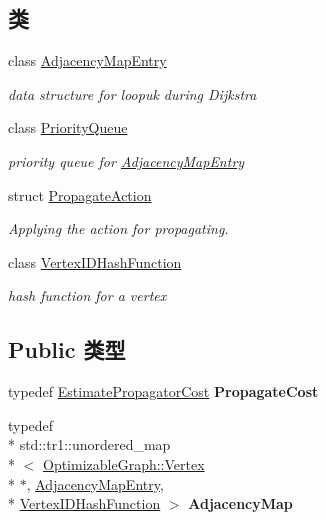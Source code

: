 \subsection*{类}
\begin{DoxyCompactItemize}
\item 
class \hyperlink{classg2o_1_1EstimatePropagator_1_1AdjacencyMapEntry}{Adjacency\-Map\-Entry}
\begin{DoxyCompactList}\small\item\em data structure for loopuk during Dijkstra \end{DoxyCompactList}\item 
class \hyperlink{classg2o_1_1EstimatePropagator_1_1PriorityQueue}{Priority\-Queue}
\begin{DoxyCompactList}\small\item\em priority queue for \hyperlink{classg2o_1_1EstimatePropagator_1_1AdjacencyMapEntry}{Adjacency\-Map\-Entry} \end{DoxyCompactList}\item 
struct \hyperlink{structg2o_1_1EstimatePropagator_1_1PropagateAction}{Propagate\-Action}
\begin{DoxyCompactList}\small\item\em Applying the action for propagating. \end{DoxyCompactList}\item 
class \hyperlink{classg2o_1_1EstimatePropagator_1_1VertexIDHashFunction}{Vertex\-I\-D\-Hash\-Function}
\begin{DoxyCompactList}\small\item\em hash function for a vertex \end{DoxyCompactList}\end{DoxyCompactItemize}
\subsection*{Public 类型}
\begin{DoxyCompactItemize}
\item 
\hypertarget{classg2o_1_1EstimatePropagator_a67a42f9c6d5f92562ac4ea12f81c8d9c}{typedef \hyperlink{classg2o_1_1EstimatePropagatorCost}{Estimate\-Propagator\-Cost} {\bfseries Propagate\-Cost}}\label{classg2o_1_1EstimatePropagator_a67a42f9c6d5f92562ac4ea12f81c8d9c}

\item 
\hypertarget{classg2o_1_1EstimatePropagator_aa450038ec206c089ecf023cb88cb2847}{typedef \\*
std\-::tr1\-::unordered\-\_\-map\\*
$<$ \hyperlink{classg2o_1_1OptimizableGraph_1_1Vertex}{Optimizable\-Graph\-::\-Vertex} \\*
$\ast$, \hyperlink{classg2o_1_1EstimatePropagator_1_1AdjacencyMapEntry}{Adjacency\-Map\-Entry}, \\*
\hyperlink{classg2o_1_1EstimatePropagator_1_1VertexIDHashFunction}{Vertex\-I\-D\-Hash\-Function} $>$ {\bfseries Adjacency\-Map}}\label{classg2o_1_1EstimatePropagator_aa450038ec206c089ecf023cb88cb2847}

\end{DoxyCompactItemize}
